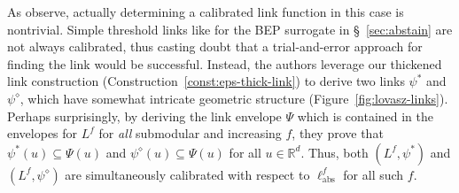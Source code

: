 \documentclass[twoside,11pt]{article}
\newcommand{\reals}{\mathbb{R}}
\newcommand{\ellabs}{\ell_{\text{abs}}^f}
\begin{document}
As \citeauthor{ourlovaszpaper} observe, actually determining a calibrated link function in this case is nontrivial.
Simple threshold links like for the BEP surrogate in \S~\ref{sec:abstain} are not always calibrated, thus casting doubt that a trial-and-error approach for finding the link would be successful.
Instead, the authors leverage our thickened link construction (Construction~\ref{const:eps-thick-link}) to derive two links $\psi^*$ and $\psi^\diamond$, which have somewhat intricate geometric structure (Figure~\ref{fig:lovasz-links}).
Perhaps surprisingly, by deriving the link envelope $\Psi$ which is contained in the envelopes for $L^f$ for \emph{all} submodular and increasing $f$, they prove that $\psi^*(u) \subseteq \Psi(u)$ and $\psi^\diamond(u) \subseteq \Psi(u)$ for all $u \in \reals^d$.
Thus, both $(L^f, \psi^*)$ and $(L^f, \psi^\diamond)$ are simultaneously calibrated with respect to $\ellabs$ for all such $f$.
\end{document}
